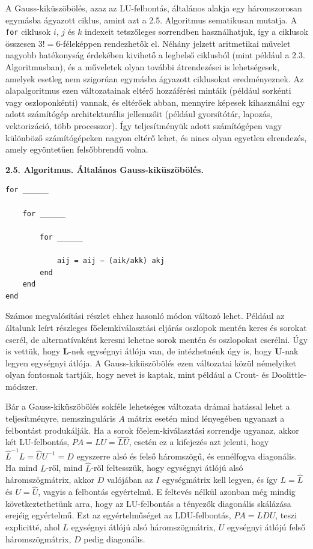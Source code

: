 \documentclass[
  magyar,
  11pt]{article}
\providecommand{\boldsymbol}[1]{\mathbf{#1}}
\begin{document}
A Gauss-kiküszöbölés, azaz az LU-felbontás, általános alakja egy
háromszorosan egymásba ágyazott ciklus, amint azt a 2.5. Algoritmus
sematikusan mutatja. A \texttt{for} ciklusok \(i\), \(j\) és \(k\)
indexeit tetszőleges sorrendben használhatjuk, így a ciklusok összesen
\(3! = 6\)-féleképpen rendezhetők el. Néhány jelzett aritmetikai művelet
nagyobb hatékonyság érdekében kivihető a legbelső ciklusból (mint
például a 2.3. Algoritmusban), és a műveletek olyan további átrendezései
is lehetségesek, amelyek esetleg nem szigorúan egymásba ágyazott
ciklusokat eredményeznek. Az alapalgoritmus ezen változatainak eltérő
hozzáférési mintáik (például sorkénti vagy oszloponkénti) vannak, és
eltérőek abban, mennyire képesek kihasználni egy adott számítógép
architekturális jellemzőit (például gyorsítótár, lapozás, vektorizáció,
több processzor). Így teljesítményük adott számítógépen vagy különböző
számítógépeken nagyon eltérő lehet, és nincs olyan egyetlen elrendezés,
amely egyöntetűen felsőbbrendű volna.

\textbf{2.5. Algoritmus. Általános Gauss-kiküszöbölés.}

\begin{verbatim}
for ______

    for ______

        for ______

            aij = aij − (aik/akk) akj
        end
    end
end
\end{verbatim}

Számos megvalósítási részlet ehhez hasonló módon változó lehet. Például
az általunk leírt részleges főelemkiválasztási eljárás oszlopok mentén
keres és sorokat cserél, de alternatívaként keresni lehetne sorok mentén
és oszlopokat cserélni. Úgy is vettük, hogy \(\boldsymbol{L}\)-nek
egységnyi átlója van, de intézhetnénk úgy is, hogy
\(\boldsymbol{U}\)-nak legyen egységnyi átlója. A Gauss-kiküszöbölés
ezen változatai közül némelyiket olyan fontosnak tartják, hogy nevet is
kaptak, mint például a Crout- és Doolittle-módszer.

Bár a Gauss-kiküszöbölés sokféle lehetséges változata drámai hatással
lehet a teljesítményre, nemszinguláris \(A\) mátrix esetén mind
lényegében ugyanazt a felbontást produkálják. Ha a sorok
főelem-kiválasztási sorrendje ugyanaz, akkor két LU-felbontás,
\(PA = LU = \hat{L}\hat{U}\), esetén ez a kifejezés azt jelenti, hogy
\(\hat{L}^{-1}L = \hat{U}U^{-1} = D\) egyszerre alsó és felső
háromszögű, és ennélfogva diagonális. Ha mind \(L\)-ről, mind
\(\hat{L}\)-ről feltesszük, hogy egységnyi átlójú alsó háromszögmátrix,
akkor \(D\) valójában az \(I\) egységmátrix kell legyen, és így
\(L = \hat{L}\) és \(U = \hat{U}\), vagyis a felbontás egyértelmű. E
feltevés nélkül azonban még mindig következtethetünk arra, hogy az
LU-felbontás a tényezők diagonális skálázása erejéig egyértelmű. Ezt az
egyértelműséget az LDU-felbontás, \(PA = LDU\), teszi explicitté, ahol
\(L\) egységnyi átlójú alsó háromszögmátrix, \(U\) egységnyi átlójú
felső háromszögmátrix, \(D\) pedig diagonális.
\end{document}
